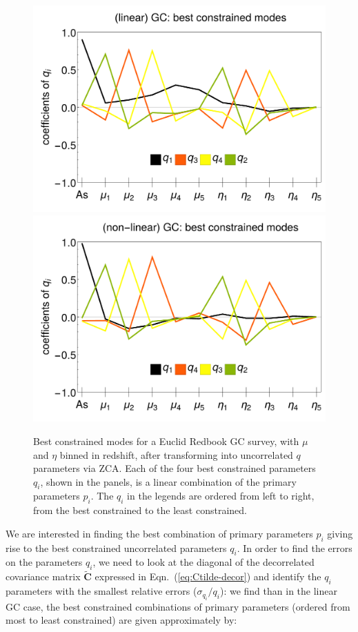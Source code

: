 \begin{figure}[htbp]
	\centering{}\includegraphics[width=0.4\linewidth]{Chapters/linear-nonlinear-MG-forecasts/figures/Decorrelations-GC/linear_GC--_best_constrained_modes-Errors_on_q_ZCA_SquareNorm--_fiducialMGBin3_Euclid_GC_linearPK_}
	\includegraphics[width=0.4\linewidth]{Chapters/linear-nonlinear-MG-forecasts/figures/Decorrelations-GC/non-linear_GC--_best_constrained_modes-Errors_on_q_ZCA_SquareNorm--_fiducialMGBin3_Euclid_GC_nonlinearPk__Zhao_}
	\caption[Best constrained modes for Euclid GC applying ZCA.]{\label{fig:GCbestconst}
Best constrained modes for a Euclid Redbook GC survey, with $\mu$ and $\eta$ binned in redshift, 
after transforming into uncorrelated $q$ parameters via ZCA. 
Each of the four best constrained parameters $q_i$, shown in the panels, 
is a linear combination of the primary parameters $p_i$. The $q_i$ in the legends are ordered from left to right, from the best constrained to the least constrained.}
\end{figure}


We are interested in finding the best combination of primary parameters $p_i$ giving rise
to the best constrained uncorrelated parameters $q_i$. In order to find the errors 
on the parameters $q_i$, we need to look at the diagonal of the decorrelated covariance matrix $\mathbf{\tilde{C}}$ expressed in Eqn.\ (\ref{eq:Ctilde-decor}) and 
identify the $q_i$ parameters with the smallest relative errors ($\sigma_{q_i}/q_i$): we find than in the linear GC case, the best 
constrained combinations of primary parameters (ordered from most to least constrained) are given approximately by:

